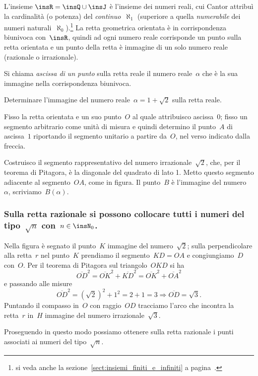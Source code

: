 L'insieme $\insR = \insQ \cup \insJ$ è l'insieme dei numeri reali, cui
Cantor attribuì la cardinalità (o potenza) del \emph{continuo}~$\aleph_1$ (superiore a quella \emph{numerabile} dei numeri naturali~$\aleph_0$).\footnote{si veda anche la sezione~\ref{sect:insiemi_finiti_e_infiniti} a pagina~\pageref{sect:insiemi_finiti_e_infiniti}.} La retta geometrica orientata è in corrispondenza biunivoca con~$\insR$,
quindi ad ogni numero reale corrisponde un punto sulla retta orientata e un punto della retta è immagine
di un solo numero reale (razionale o irrazionale).

\begin{definizione}
Si chiama \emph{ascissa di un punto} sulla retta reale il numero reale~$\alpha$ che è la sua immagine nella corrispondenza biunivoca.
\end{definizione}
\pagebreak

\begin{exrig}
 \begin{esempio}
Determinare l'immagine del numero reale~$\alpha =1+\sqrt{2}$ sulla retta reale.

Fisso la retta orientata e un suo punto~$O$ al quale attribuisco ascissa~$0$;
fisso un segmento arbitrario come unità di misura e quindi determino il punto~$A$ di ascissa~$1$ riportando il segmento unitario
a partire da~$O$, nel verso indicato dalla freccia.
\begin{center}
 
\end{center}
Costruisco il segmento rappresentativo del numero irrazionale~$\sqrt{2}$, che, per il teorema di Pitagora, è la diagonale del quadrato di lato 1.
Metto questo segmento adiacente al segmento~$OA$, come in figura.
Il punto~$B$ è l'immagine del numero~$\alpha$, scriviamo~$B(\alpha)$.
\begin{center}
 
\end{center}
 \end{esempio}
\end{exrig}

\subsubsection*{Sulla retta razionale si possono collocare tutti i numeri del tipo~$\sqrt{n}$ con~$n\in \insN_{0}$.}

Nella figura è segnato il punto~$K$ immagine del numero~$\sqrt{2}$; sulla perpendicolare alla retta~$r$ nel punto~$K$
prendiamo il segmento~$KD=OA$ e congiungiamo~$D$ con~$O$. Per il teorema di Pitagora sul
triangolo~$OKD$ si ha
\[\overline{OD}^{2}=\overline{OK}^{2}+\overline{KD}^{2}=\overline{OK}^{2}+\overline{OA}^{2}\]
e passando alle misure
\[\overline{OD}^{2}=(\sqrt{2})^{2}+1^{2}=2+1=3\Rightarrow\overline{OD}=\sqrt{3}.\]
Puntando il compasso in~$O$ con raggio~${OD}$ tracciamo l'arco che incontra la retta~$r$ in~$H$ immagine
del numero irrazionale~${\sqrt{3}}$.
\begin{center}
 
\end{center}
Proseguendo in questo modo possiamo ottenere sulla retta razionale i punti associati ai numeri del tipo~${\sqrt{n}}$.

